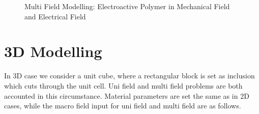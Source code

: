 \begin{figure}[htbp]
  \caption{Multi Field Modelling: Electroactive Polymer in Mechanical Field and Electrical Field}
\end{figure}

\newpage
\section{3D Modelling}
In 3D case we consider a unit cube, where a rectangular block is set as inclusion which cuts through the unit cell. Uni field and multi field problems are both accounted in this circumstance. Material parameters are set the same as in 2D cases, while the macro field input for uni field and multi field are as follows.

